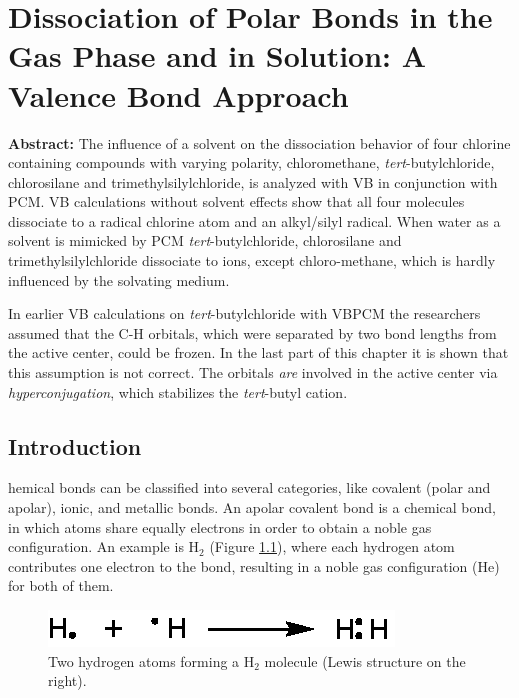 \chapter{Dissociation of Polar Bonds in the Gas Phase and in Solution: A Valence Bond Approach}
\label{chap_dissociation}


\noindent\textbf{Abstract:} The influence of a solvent on the dissociation behavior of four chlorine containing compounds with varying polarity, chloromethane, \textit{tert}-butylchloride, chlorosilane and trimethylsilylchloride, is analyzed with VB in conjunction with PCM. VB calculations without solvent effects show that all four molecules dissociate to a radical chlorine atom and an alkyl/silyl radical. When water as a solvent is mimicked by PCM \textit{tert}-butylchloride, chlorosilane and trimethylsilylchloride dissociate to ions, except chloro-methane, which is hardly influenced by the solvating medium.

In earlier VB calculations on  \textit{tert}-butylchloride with VBPCM the researchers assumed that the C-H orbitals, which were separated by two bond lengths from the active center, could be frozen. In the last part of this chapter it is shown that this assumption is not correct. The orbitals \textit{are} involved in the active center via \textit{hyperconjugation}, which stabilizes the \textit{tert}-butyl cation. 

\clearpage

\section{Introduction}

\lettrine{}{}hemical bonds can be classified into several categories, like covalent (polar and apolar), ionic, and metallic bonds. An apolar covalent bond is a chemical bond, in which atoms share equally electrons in order to obtain a noble gas configuration. An example is H$_2$ (Figure \ref{ch3.fig.h_twee}), where each hydrogen atom contributes one electron to the bond, resulting in a noble gas configuration (He) for both of them.
\begin{figure}[ht]
\center
\includegraphics{dissociation/figures/h_twee.eps}
\caption{Two hydrogen atoms forming a H$_2$ molecule (Lewis structure on the right).}
\label{ch3.fig.h_twee} 
\end{figure}

